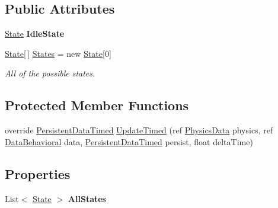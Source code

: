 \subsection*{Public Attributes}
\begin{DoxyCompactItemize}
\item 
\hypertarget{class_skyrates_1_1_a_i_1_1_state_1_1_state_machine_a056f4fcc07c57a0d967bf61424e0b085}{\hyperlink{class_skyrates_1_1_a_i_1_1_state_1_1_state}{State} {\bfseries Idle\-State}}\label{class_skyrates_1_1_a_i_1_1_state_1_1_state_machine_a056f4fcc07c57a0d967bf61424e0b085}

\item 
\hyperlink{class_skyrates_1_1_a_i_1_1_state_1_1_state}{State}\mbox{[}$\,$\mbox{]} \hyperlink{class_skyrates_1_1_a_i_1_1_state_1_1_state_machine_a892016093699b67b71a2f69c5fb6443f}{States} = new \hyperlink{class_skyrates_1_1_a_i_1_1_state_1_1_state}{State}\mbox{[}0\mbox{]}
\begin{DoxyCompactList}\small\item\em All of the possible states. \end{DoxyCompactList}\end{DoxyCompactItemize}
\subsection*{Protected Member Functions}
\begin{DoxyCompactItemize}
\item 
override \hyperlink{class_skyrates_1_1_a_i_1_1_behavior_timed_1_1_persistent_data_timed}{Persistent\-Data\-Timed} \hyperlink{class_skyrates_1_1_a_i_1_1_state_1_1_state_machine_aaf0c030821a596d0bdeee0b87c96bd6e}{Update\-Timed} (ref \hyperlink{class_skyrates_1_1_physics_1_1_physics_data}{Physics\-Data} physics, ref \hyperlink{class_skyrates_1_1_a_i_1_1_behavior_1_1_data_behavioral}{Data\-Behavioral} data, \hyperlink{class_skyrates_1_1_a_i_1_1_behavior_timed_1_1_persistent_data_timed}{Persistent\-Data\-Timed} persist, float delta\-Time)
\end{DoxyCompactItemize}
\subsection*{Properties}
\begin{DoxyCompactItemize}
\item 
\hypertarget{class_skyrates_1_1_a_i_1_1_state_1_1_state_machine_a7faffae06917c566f97b2365e6a8bd1a}{List$<$ \hyperlink{class_skyrates_1_1_a_i_1_1_state_1_1_state}{State} $>$ {\bfseries All\-States}}\label{class_skyrates_1_1_a_i_1_1_state_1_1_state_machine_a7faffae06917c566f97b2365e6a8bd1a}

\end{DoxyCompactItemize}


